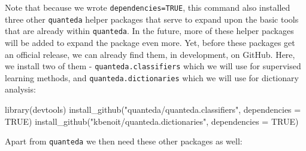 \documentclass[
]{book}
\newenvironment{Shaded}{\begin{snugshade}}{\end{snugshade}}
\newcommand{\AttributeTok}[1]{\textcolor[rgb]{0.77,0.63,0.00}{#1}}
\newcommand{\ConstantTok}[1]{\textcolor[rgb]{0.00,0.00,0.00}{#1}}
\newcommand{\FunctionTok}[1]{\textcolor[rgb]{0.00,0.00,0.00}{#1}}
\newcommand{\NormalTok}[1]{#1}
\newcommand{\StringTok}[1]{\textcolor[rgb]{0.31,0.60,0.02}{#1}}
\begin{document}
Note that because we wrote \texttt{dependencies=TRUE}, this command also installed three other \texttt{quanteda} helper packages that serve to expand upon the basic tools that are already within \texttt{quanteda}. In the future, more of these helper packages will be added to expand the package even more. Yet, before these packages get an official release, we can already find them, in development, on GitHub. Here, we install two of them - \texttt{quanteda.classifiers} which we will use for supervised learning methods, and \texttt{quanteda.dictionaries} which we will use for dictionary analysis:

\begin{Shaded}
\begin{Highlighting}[]
\FunctionTok{library}\NormalTok{(devtools)}
\FunctionTok{install\_github}\NormalTok{(}\StringTok{"quanteda/quanteda.classifiers"}\NormalTok{, }\AttributeTok{dependencies =} \ConstantTok{TRUE}\NormalTok{)}
\FunctionTok{install\_github}\NormalTok{(}\StringTok{"kbenoit/quanteda.dictionaries"}\NormalTok{, }\AttributeTok{dependencies =} \ConstantTok{TRUE}\NormalTok{)}
\end{Highlighting}
\end{Shaded}

Apart from \texttt{quanteda} we then need these other packages as well:
\end{document}
